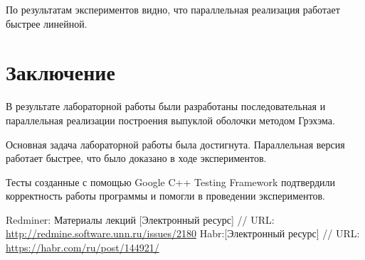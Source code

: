 \documentclass{report}
\begin{document}
\par По результатам экспериментов видно, что параллельная реализация работает быстрее линейной.
\newpage

\section*{Заключение}
В результате лабораторной работы были разработаны последовательная и параллельная реализации построения выпуклой оболочки методом Грэхэма.
\par Основная задача лабораторной работы была достигнута. Параллельная версия работает быстрее, что было доказано в ходе экспериментов.
\par Тесты созданные с помощью Google C++ Testing Framework подтвердили корректность работы программы и помогли в проведении экспериментов.
\newpage

\begin{thebibliography}{1}
 Redminer: Материалы лекций [Электронный ресурс] // URL: \url{http://redmine.software.unn.ru/issues/2180}
 Habr:[Электронный ресурс] // URL: \url {https://habr.com/ru/post/144921/}
\end{thebibliography}
\newpage

\end{document}
